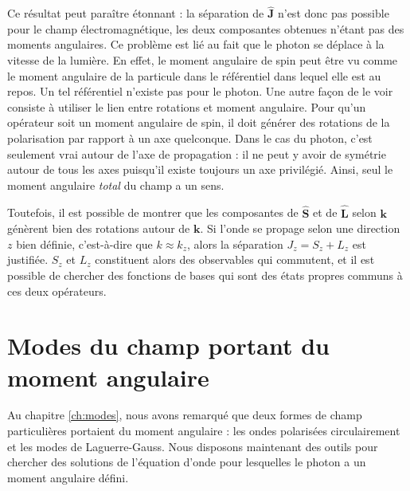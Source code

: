Ce résultat peut paraître étonnant : la séparation de $\hat{\bm{J}}$ n'est donc pas possible pour le champ électromagnétique, les deux composantes obtenues n'étant pas des moments angulaires. Ce problème est lié au fait que le photon se déplace à la vitesse de la lumière. En effet, le moment angulaire de spin peut être vu comme le moment angulaire de la particule dans le référentiel dans lequel elle est au repos. Un tel référentiel n'existe pas pour le photon. Une autre façon de le voir consiste à utiliser le lien entre rotations et moment angulaire. Pour qu'un opérateur soit un moment angulaire de spin, il doit générer des rotations de la polarisation par rapport à un axe quelconque. Dans le cas du photon, c'est seulement vrai autour de l'axe de propagation : il ne peut y avoir de symétrie autour de tous les axes puisqu'il existe toujours un axe privilégié. Ainsi, seul le moment angulaire \textit{total} du champ a un sens.

Toutefois, il est possible de montrer  que les composantes de $\hat{\bm{S}}$ et de $\hat{\bm{L}}$ selon $\bm{k}$ génèrent bien des rotations autour de $\bm{k}$. Si l'onde se propage selon une direction $z$ bien définie, c'est-à-dire que $k\approx k_z$, alors la séparation $J_z = S_z + L_z$ est justifiée. $S_z$ et $L_z$ constituent alors des observables qui commutent, et il est possible de chercher des fonctions de bases qui sont des états propres communs à ces deux opérateurs.

\chapter{Modes du champ portant du moment angulaire}
Au chapitre \ref{ch:modes}, nous avons remarqué que deux formes de champ particulières portaient du moment angulaire : les ondes polarisées circulairement et les modes de Laguerre-Gauss. Nous disposons maintenant des outils pour chercher des solutions de l'équation d'onde pour lesquelles le photon a un moment angulaire défini.

